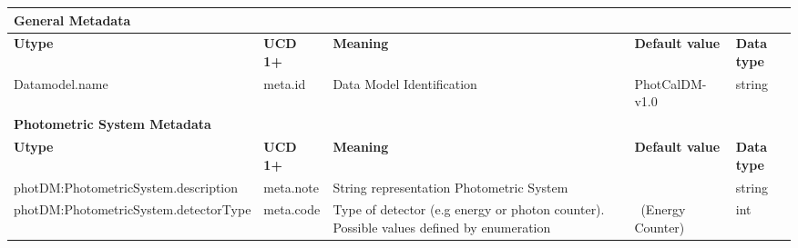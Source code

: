 \documentclass[11pt,a4paper]{ivoa}
\begin{document}
\begin{appendices}
\begin{table}[H]
 			\centering
 			\begin{adjustbox}{angle=90}
\begin{tabular}{p{2.5in}|p{1.5in}|p{2in}|p{0.74in}|p{0.35in}}
\multicolumn{5}{p{\dimexpr6.59in+8\tabcolsep\relax}}{\centering 
{\fontsize{8pt}{8pt}\selectfont \textbf{General Metadata}}} \\
\hline
\multicolumn{1}{p{2.5in}}{{\fontsize{8pt}{8pt}\selectfont \textbf{Utype}}} &
\multicolumn{1}{p{1.5in}}{{\fontsize{8pt}{8pt}\selectfont \textbf{UCD 1+}}} &
\multicolumn{1}{p{2in}}{{\fontsize{8pt}{8pt}\selectfont \textbf{Meaning}}} &
\multicolumn{1}{p{0.74in}}{{\fontsize{8pt}{8pt}\selectfont \textbf{Default value}}} &
\multicolumn{1}{p{0.35in}}{{\fontsize{8pt}{8pt}\selectfont \textbf{Data type}}} \\
\hline
\multicolumn{1}{p{2.5in}}{{\fontsize{8pt}{8pt}\selectfont Datamodel.name}} &
\multicolumn{1}{p{1.5in}}{{\fontsize{8pt}{8pt}\selectfont meta.id }} &
\multicolumn{1}{p{2in}}{{\fontsize{8pt}{8pt}\selectfont Data Model Identification }} &
\multicolumn{1}{p{0.74in}}{{\fontsize{8pt}{8pt}\selectfont PhotCalDM-v1.0}} &
\multicolumn{1}{p{0.35in}}{{\fontsize{8pt}{8pt}\selectfont string}} \\
\hline
\multicolumn{5}{p{\dimexpr6.59in+8\tabcolsep\relax}}{\centering 
{\fontsize{8pt}{8pt}\selectfont \textbf{Photometric System Metadata}}} \\
\hline
\multicolumn{1}{p{2.5in}}{{\fontsize{8pt}{8pt}\selectfont \textbf{Utype}}} &
\multicolumn{1}{p{1.5in}}{{\fontsize{8pt}{8pt}\selectfont \textbf{UCD 1+}}} &
\multicolumn{1}{p{2in}}{{\fontsize{8pt}{8pt}\selectfont \textbf{Meaning}}} &
\multicolumn{1}{p{0.74in}}{{\fontsize{8pt}{8pt}\selectfont \textbf{Default value}}} &
\multicolumn{1}{p{0.35in}}{{\fontsize{8pt}{8pt}\selectfont \textbf{Data type}}} \\
\hline
\multicolumn{1}{p{2.5in}}{{\fontsize{8pt}{8pt}\selectfont photDM:PhotometricSystem.description}} &
\multicolumn{1}{p{1.5in}}{{\fontsize{8pt}{8pt}\selectfont meta.note }} &
\multicolumn{1}{p{2in}}{{\fontsize{8pt}{8pt}\selectfont String representation Photometric System}} &
\multicolumn{1}{p{0.74in}}{} &
\multicolumn{1}{p{0.35in}}{{\fontsize{8pt}{8pt}\selectfont string}} \\
\hline
\multicolumn{1}{p{2.5in}}{{\fontsize{8pt}{8pt}\selectfont photDM:PhotometricSystem.detectorType}} &
\multicolumn{1}{p{1.5in}}{{\fontsize{8pt}{8pt}\selectfont meta.code }} &
\multicolumn{1}{p{2in}}{{\fontsize{8pt}{8pt}\selectfont Type of detector 
(e.g energy or photon counter). Possible values defined by enumeration}} &
\multicolumn{1}{p{0.74in}}{{\fontsize{8pt}{8pt}\selectfont 0\  (Energy Counter)}} &
\multicolumn{1}{p{0.35in}}{{\fontsize{8pt}{8pt}\selectfont int}} \\
\hline
\end{tabular}
\end{adjustbox}
 \end{table}


\end{appendices}
\end{document}
